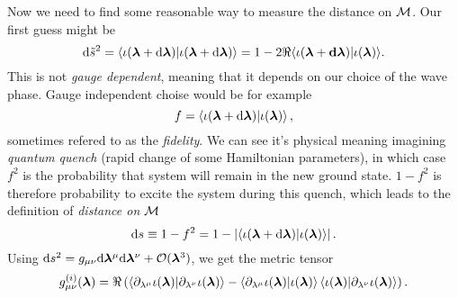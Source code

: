 Now we need to find some reasonable way to measure the distance on $\mathcal{M}$. Our first guess might be
\begin{equation}
    \mathrm{d} \tilde{s}^2 = \braket{\iota(\bm{\bm\lambda}+\mathrm{d}\bm{\bm\lambda})|\iota(\bm{\bm\lambda}+\mathrm{d}\bm{\bm\lambda})} = 1-2\Re{\braket{\iota(\bm{\bm\lambda}+\bm{\ensuremath{\mathrm{d}}}\bm\lambda)|\iota(\bm{\bm\lambda})}}.
\end{equation}
This is not \emph{gauge dependent}, meaning that it depends on our choice of the wave phase. Gauge independent choise would be for example 
\begin{equation}
    f=\braket{\iota(\bm{\bm\lambda}+\mathrm{d}\bm{\bm\lambda})|\iota(\bm{\bm\lambda})},
\end{equation}
sometimes refered to as the \emph{fidelity}. We can see it's physical meaning imagining \emph{quantum quench} (rapid change of some Hamiltonian parameters), in which case $f^2$ is the probability that system will remain in the new ground state. $1-f^2$ is therefore probability to excite the system during this quench, which leads to the definition of \emph{distance on $\mathcal{M}$}
\begin{equation}
    \mathrm{d} s \equiv 1-f^2= 1-\left|\braket{\iota(\bm{\bm\lambda}+\mathrm{d}\bm{\bm\lambda})|\iota(\bm{\bm\lambda})}\right|.
\end{equation}
Using $\mathrm{d} s^2 = g_{\mu\nu}\mathrm{d} \bm\lambda^\mu \mathrm{d}\bm\lambda^\nu+\mathcal{O}(\bm\lambda^3)$, we get the metric tensor
\begin{equation}
    g_{\mu\nu}^{(i)}(\bm{\bm\lambda}) = \Re\left(\braket{\partial_{\lambda^\mu}\iota(\bm{\bm\lambda})|\partial_{\lambda^\nu}\iota(\bm{\bm\lambda})} - \braket{\partial_{\lambda^\mu}\iota(\bm{\bm\lambda})|\iota(\bm{\bm\lambda})}\braket{\iota(\bm{\bm\lambda})|\partial_{\lambda^\nu}\iota(\bm{\bm\lambda})}\right).
    \label{eq:geom.tensorDefinition}
\end{equation}


